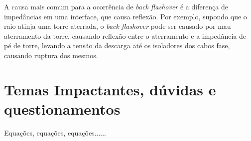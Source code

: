 \documentclass[a4paper, 12pt, onecolumn,singlespacing]{article}
\begin{document}
	A causa mais comum para a ocorrência de \textit{back flashover} é a diferença de impedâncias em uma interface, que causa reflexão. Por exemplo, supondo que o raio atinja uma torre aterrada, o \textit{back flashover} pode ser causado por mau aterramento da torre, causando reflexão entre o aterramento e a impedância de pé de torre, levando a tensão da descarga até os isoladores dos cabos fase, causando ruptura dos mesmos.
	
	
	\section{Temas Impactantes, dúvidas e questionamentos}
	Equações, equações, equações......
	
\end{document}
